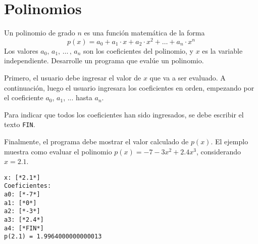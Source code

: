 \section{Polinomios}

Un polinomio de grado \(n\)
es una función matemática de la forma
\begin{equation*}
p(x) = a_0
  + a_1 \cdot x
  + a_2 \cdot x^2
  + \hdots
  + a_n \cdot x^n
\end{equation*}
Los valores \(a_0, \, a_1, \, \hdots \, , \, a_n\)
son los coeficientes del polinomio,
y \(x\) es la variable independiente.
Desarrolle un programa que evalúe un polinomio.

Primero, el usuario debe ingresar el valor de $x$ que va a ser evaluado. A continuación, luego el usuario ingresara los coeficientes en orden, empezando por el coeficiente $a_0$, $a_1$, ... hasta $a_n$.

Para indicar que todos los coeficientes han sido ingresados, se debe escribir el texto \texttt{FIN}. 

Finalmente, el programa debe mostrar el valor calculado de $p(x)$. El ejemplo muestra como evaluar el polinomio $p(x) = -7 - 3x^2 + 2.4x^3$, considerando $x = 2.1$.

\begin{lstlisting}[style=consola]
x: [*2.1*]
Coeficientes:
a0: [*-7*]
a1: [*0*]
a2: [*-3*]
a3: [*2.4*]
a4: [*FIN*]
p(2.1) = 1.9964000000000013
\end{lstlisting}
